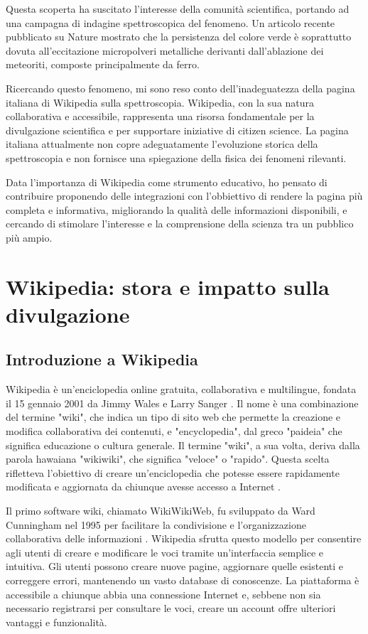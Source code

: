 \documentclass[12pt,a4paper]{report}
\begin{document}
Questa scoperta ha suscitato l'interesse della comunità scientifica, portando ad una campagna di indagine spettroscopica del fenomeno. Un articolo recente pubblicato su Nature mostrato che la persistenza del colore verde è soprattutto dovuta all'eccitazione micropolveri metalliche derivanti dall'ablazione dei meteoriti, composte principalmente da ferro\cite{passas-varo2023spectroscopy}.

Ricercando questo fenomeno, mi sono reso conto dell'inadeguatezza della pagina italiana di Wikipedia sulla spettroscopia. Wikipedia, con la sua natura collaborativa e accessibile, rappresenta una risorsa fondamentale per la divulgazione scientifica e per supportare iniziative di citizen science. La pagina italiana attualmente non copre adeguatamente l'evoluzione storica della spettroscopia e non fornisce una spiegazione della fisica dei fenomeni rilevanti. 

Data l'importanza di Wikipedia come strumento educativo, ho pensato di contribuire proponendo delle integrazioni con l'obbiettivo di rendere la pagina più completa e informativa, migliorando la qualità delle informazioni disponibili, e cercando di stimolare l'interesse e la comprensione della scienza tra un pubblico più ampio.

\chapter{Wikipedia: stora e impatto sulla divulgazione}

\section{Introduzione a Wikipedia}

Wikipedia è un'enciclopedia online gratuita, collaborativa e multilingue, fondata il 15 gennaio 2001 da Jimmy Wales e Larry Sanger \cite{lih2009wikipedia}. Il nome è una combinazione del termine "wiki", che indica un tipo di sito web che permette la creazione e modifica collaborativa dei contenuti, e "encyclopedia", dal greco "paideia" che significa educazione o cultura generale. Il termine "wiki", a sua volta, deriva dalla parola hawaiana "wikiwiki", che significa "veloce" o "rapido". Questa scelta rifletteva l'obiettivo di creare un'enciclopedia che potesse essere rapidamente modificata e aggiornata da chiunque avesse accesso a Internet \cite{cunningham2001wiki}. 

Il primo software wiki, chiamato WikiWikiWeb, fu sviluppato da Ward Cunningham nel 1995 per facilitare la condivisione e l'organizzazione collaborativa delle informazioni \cite{cunningham2001wiki}. Wikipedia sfrutta questo modello per consentire agli utenti di creare e modificare le voci tramite un'interfaccia semplice e intuitiva. Gli utenti possono creare nuove pagine, aggiornare quelle esistenti e correggere errori, mantenendo un vasto database di conoscenze. La piattaforma è accessibile a chiunque abbia una connessione Internet e, sebbene non sia necessario registrarsi per consultare le voci, creare un account offre ulteriori vantaggi e funzionalità.
\end{document}
